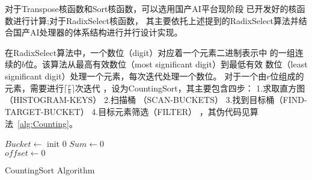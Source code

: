 对于Transpose核函数和Sort核函数，可以选用国产AI平台现阶段
已开发好的核函数进行计算;对于RadixSelect核函数，
其主要依托上述提到的RadixSelect算法并结合国产AI处理器的体系结构进行并行设计实现。

在RadixSelect算法中，一个数位（digit）对应着一个元素二进制表示中
的一组连续的\(b\)位。该算法从最高有效数位（most significant digit）到最低有效
数位（least significant digit）处理一个元素，每次迭代处理一个数位。
对于一个由\(r\)位组成的元素，需要进行\(\lceil\frac{r}{b}\rceil\)次迭代
，设为CountingSort，其主要包含四步：
1.求取直方图（HISTOGRAM-KEYS） 
2.扫描桶 （SCAN-BUCKETS） 
3.找到目标桶（FIND-TARGET-BUCKET） 
4.目标元素筛选（FILTER）
，其伪代码见算法~\ref{alg:Counting}。

\begin{algorithm}
    \label{alg:Counting}
    $Bucket \leftarrow$ init $0$ 
    $Sum \leftarrow 0$\;\\
    $offset \leftarrow 0$\\
    \caption{CountingSort Algorithm}
\end{algorithm}


